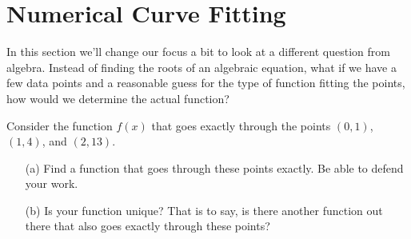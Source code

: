 % 
% 
% 

\newpage\section{Numerical Curve Fitting}
In this section we'll change our focus a bit to look at a different question from algebra.
Instead of finding the roots of an algebraic equation, what if we have a few data points
and a reasonable guess for the type of function fitting the points, how would we determine
the actual function?  

\begin{problem}
    Consider the function $f(x)$ that goes exactly through the points $(0,1)$, $(1,4)$,
    and $(2,13)$.  
    \begin{enumerate}
        \item[(a)] Find a function that goes through these points exactly.  Be able to
            defend your work.
        \item[(b)] Is your function unique?  That is to say, is there another function out
            there that also goes exactly through these points?  
    \end{enumerate}
\end{problem}

